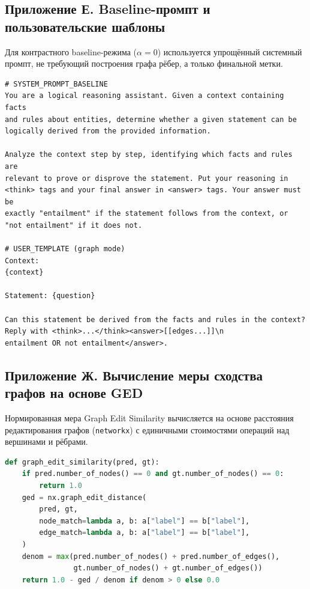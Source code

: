 \subsection*{Приложение Е. Baseline-промпт и пользовательские шаблоны}

Для контрастного baseline-режима ($\alpha=0$) используется упрощённый системный промпт, не требующий построения графа рёбер, а только финальной метки.

\begin{lstlisting}[basicstyle=\footnotesize\ttfamily]
# SYSTEM_PROMPT_BASELINE
You are a logical reasoning assistant. Given a context containing facts
and rules about entities, determine whether a given statement can be
logically derived from the provided information.

Analyze the context step by step, identifying which facts and rules are
relevant to prove or disprove the statement. Put your reasoning in
<think> tags and your final answer in <answer> tags. Your answer must be
exactly "entailment" if the statement follows from the context, or
"not entailment" if it does not.

# USER_TEMPLATE (graph mode)
Context:
{context}

Statement: {question}

Can this statement be derived from the facts and rules in the context?
Reply with <think>...</think><answer>[[edges...]]\n
entailment OR not entailment</answer>.
\end{lstlisting}

\subsection*{Приложение Ж. Вычисление меры сходства графов на основе GED}

Нормированная мера Graph Edit Similarity вычисляется на основе расстояния редактирования графов (\texttt{networkx}) с единичными стоимостями операций над вершинами и рёбрами.

\begin{lstlisting}[language=Python, basicstyle=\footnotesize\ttfamily]
def graph_edit_similarity(pred, gt):
    if pred.number_of_nodes() == 0 and gt.number_of_nodes() == 0:
        return 1.0
    ged = nx.graph_edit_distance(
        pred, gt,
        node_match=lambda a, b: a["label"] == b["label"],
        edge_match=lambda a, b: a["label"] == b["label"],
    )
    denom = max(pred.number_of_nodes() + pred.number_of_edges(),
                gt.number_of_nodes() + gt.number_of_edges())
    return 1.0 - ged / denom if denom > 0 else 0.0
\end{lstlisting}

